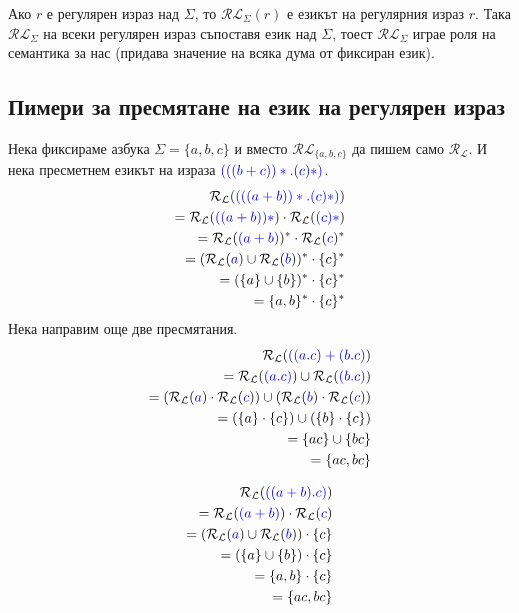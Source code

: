 \documentclass[12pt]{article}
\begin{document}
Ако \(r\) е регулярен израз над \(\Sigma\), то \(\mathcal{RL}_\Sigma(r)\) е езикът на регулярния израз \(r\).
Така \(\mathcal{RL}_\Sigma\) на всеки регулярен израз съпоставя език над \(\Sigma\), тоест \(\mathcal{RL}_\Sigma\) играе роля на семантика за нас (придава значение на всяка дума от фиксиран език).

\subsection{Пимери за пресмятане на език на регулярен израз}

Нека фиксираме азбука \(\Sigma = \{a, b, c\}\) и вместо \(\mathcal{RL}_{\{a, b, c\}}\) да пишем само \(\mathcal{R_L}\).
И нека пресметнем езикът на израза \(\textcolor{blue}{(((b + c))* . (c)*)}\).
\begin{align*}
    \mathcal{R_L}(\textcolor{blue}{(((a + b))* . (c)*)}) \\
    = \mathcal{R_L}(\textcolor{blue}{((a + b))*}) \cdot \mathcal{R_L}(\textcolor{blue}{(c)*}) \\
    = \mathcal{R_L}(\textcolor{blue}{(a + b)})^* \cdot \mathcal{R_L}(\textcolor{blue}{c})^* \\
    = (\mathcal{R_L}(\textcolor{blue}{a}) \cup \mathcal{R_L}(\textcolor{blue}{b}) )^* \cdot \{c\}^* \\
    = (\{a\} \cup \{b\})^* \cdot \{c\}^* \\
    = \{a, b\}^* \cdot \{c\}^*
\end{align*}
Нека направим още две пресмятания.
\begin{align*}
    \mathcal{R_L}(\textcolor{blue}{((a.c) + (b.c)}) \\
    = \mathcal{R_L}(\textcolor{blue}{(a.c)}) \cup \mathcal{R_L}(\textcolor{blue}{(b.c)}) \\
    = (\mathcal{R_L}(\textcolor{blue}{a}) \cdot \mathcal{R_L}(\textcolor{blue}{c}))  \cup (\mathcal{R_L}(\textcolor{blue}{b}) \cdot \mathcal{R_L}(\textcolor{blue}{c}))  \\
    = (\{a\} \cdot \{c\}) \cup (\{b\} \cdot \{c\})  \\
    = \{ac\} \cup \{bc\} \\
    = \{ac, bc\}
\end{align*}

\begin{align*}
    \mathcal{R_L}(\textcolor{blue}{((a + b) . c)}) \\
    = \mathcal{R_L}(\textcolor{blue}{(a + b)}) \cdot \mathcal{R_L}(\textcolor{blue}{c}) \\
    = (\mathcal{R_L}(\textcolor{blue}{a}) \cup \mathcal{R_L}(\textcolor{blue}{b})) \cdot \{c\}  \\
    = (\{a\} \cup \{b\}) \cdot \{c\} \\
    = \{a, b\} \cdot \{c\} \\
    = \{ac, bc\}
\end{align*}
\end{document}
